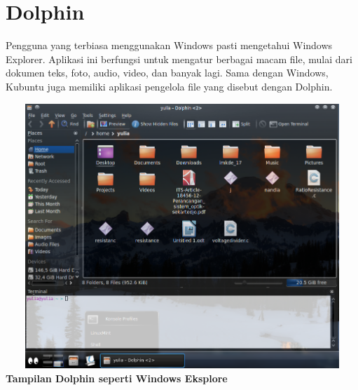 \documentclass[11pt,fleqn]{book} %
\begin{document}
\section{Dolphin}
\hspace{10pt} Pengguna yang terbiasa menggunakan Windows pasti mengetahui Windows Explorer. 
Aplikasi ini berfungsi untuk mengatur berbagai macam file, mulai dari dokumen teks, foto, audio, video, dan banyak lagi. 
Sama dengan Windows, Kubuntu juga memiliki aplikasi pengelola file yang disebut dengan Dolphin.\\ 
\begin{center}
\includegraphics[width=14cm,height=10cm]{dolphin.png}\\
\textbf{Tampilan Dolphin seperti Windows Eksplore}
\end{center}
\end{document}

